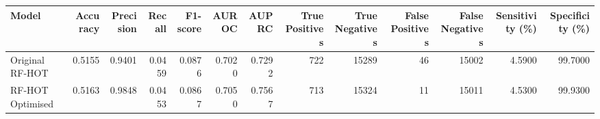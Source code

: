 \begin{tabular}{lrrrrrrrrrrrr}
\toprule
            Model &  Accuracy &  Precision &  Recall &  F1-score &  AUROC &  AUPRC &  True Positives &  True Negatives &  False Positives &  False Negatives &  Sensitivity (\%) &  Specificity (\%) \\
\midrule
  Original RF-HOT &    0.5155 &     0.9401 &  0.0459 &    0.0876 & 0.7020 & 0.7292 &             722 &           15289 &               46 &            15002 &           4.5900 &          99.7000 \\
 RF-HOT Optimised &    0.5163 &     0.9848 &  0.0453 &    0.0867 & 0.7050 & 0.7567 &             713 &           15324 &               11 &            15011 &           4.5300 &          99.9300 \\
\bottomrule
\end{tabular}
